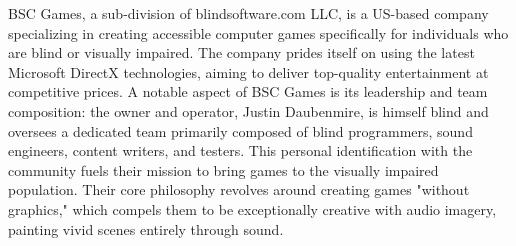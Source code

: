 BSC Games, a sub-division of blindsoftware.com LLC, is a US-based company specializing in creating accessible computer games specifically for individuals who are blind or visually impaired\supercite{DigitalStorm2025}. The company prides itself on using the latest Microsoft DirectX technologies, aiming to deliver top-quality entertainment at competitive prices\supercite{DigitalStorm2025}. A notable aspect of BSC Games is its leadership and team composition: the owner and operator, Justin Daubenmire, is himself blind and oversees a dedicated team primarily composed of blind programmers, sound engineers, content writers, and testers\supercite{DigitalStorm2025}. This personal identification with the community fuels their mission to bring games to the visually impaired population\supercite{DigitalStorm2025}. Their core philosophy revolves around creating games "without graphics," which compels them to be exceptionally creative with audio imagery, painting vivid scenes entirely through sound\supercite{DigitalStorm2025}.
